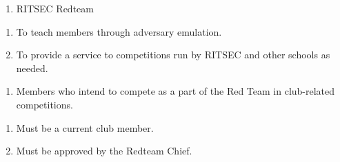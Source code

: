 

\begin{enumerate}
  \item RITSEC Redteam
\end{enumerate}


\begin{enumerate}
  \item To teach members through adversary emulation.
  \item To provide a service to competitions run by RITSEC and other schools as needed.
\end{enumerate}


\begin{enumerate}
  \item Members who intend to compete as a part of the Red Team in club-related
        competitions.
\end{enumerate}


\begin{enumerate}
  \item Must be a current club member.
  \item Must be approved by the Redteam Chief.
\end{enumerate}